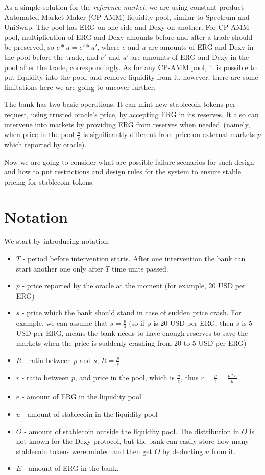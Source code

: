 \documentclass{article}   %
\newcommand{\bc}{ERG}
\newcommand{\stc}{stablecoin}
\newcommand{\sct}{stablecoin}
\newcommand{\dx}{Dexy}
\begin{document}
As a simple solution for the {\em reference market}, we are using constant-product Automated Market Maker (CP-AMM) liquidity pool, similar to Spectrum and UniSwap. The pool has \bc{} on one side and \dx{} on another. For CP-AMM pool, multiplication of \bc{} and \dx{} amounts before and after a trade should be preserved, so $e * u = e' * u'$, where $e$ and $u$ are amounts of \bc{} and \dx{} in the pool before the trade, and $e'$ and $u'$ are amounts of \bc{} and \dx{} in the pool after the trade, correspondingly. As for any CP-AMM pool, it is possible to put liquidity into the pool, and remove liquidity from it, however, there are some limitations here we are going to uncover further. 

The bank has two basic operations. It can mint new \sct{} tokens per request, using trusted oracle's price, by accepting \bc{} in its reserves. It also can intervene into markets by providing \bc{} from reserves when needed~(namely, when price in the pool $\frac{u}{e}$ is significantly different from price on external markets $p$ which reported by oracle).

Now we are going to consider what are possible failure scenarios for such design and how to put restrictions and design rules for the system to ensure stable pricing for \sct{} tokens. 

\section{Notation}

We start by introducing notation: 
\begin{itemize}
  \item{} $T$ - period before intervention starts. After one intervention the bank can start another one only after $T$ time units passed. 
  \item{} $p$ - price reported by the oracle at the moment (for example, 20 USD per ERG)
  \item{} $s$ - price which the bank should stand in case of sudden price crash. For example, we can assume that $s = \frac{p}{4}$ (so if p is 20 USD per ERG, then $s$ is 5 USD per ERG, means the bank needs to have enough reserves to save the markets when the price is suddenly crashing from 20 to 5 USD per ERG)
  \item{} $R$ - ratio between $p$ and $s$, $R = \frac{p}{s}$
  \item{} $r$ - ratio between $p$, and price in the pool, which is $\frac{u}{e}$, thus $r = \frac{p}{\frac{u}{e}} = \frac{p*e}{u}$
  \item{} $e$ - amount of \bc{} in the liquidity pool 
  \item{} $u$ - amount of \stc{} in the liquidity pool
  \item{} $O$ - amount of \stc{} outside the liquidity pool. The distribution in $O$ is not known for the \dx{} protocol, but the bank can easily store how many \sct{} tokens were minted and then get $O$ by deducting $u$ from it.
  \item{} $E$ - amount of \bc{} in the bank. 
\end{itemize}  
\end{document}
